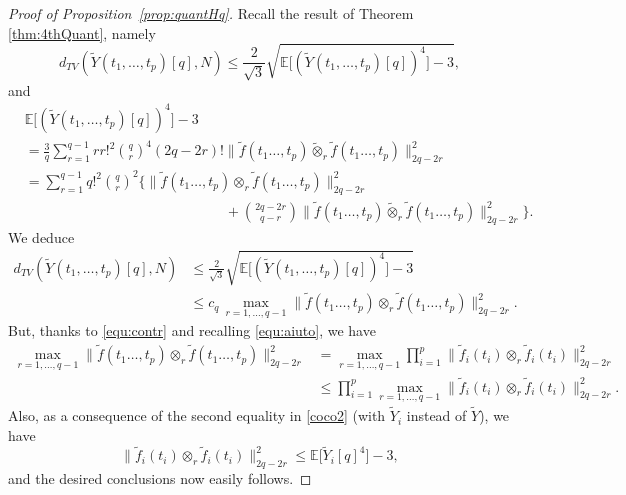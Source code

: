 \documentclass[12pt]{article}
\DeclareMathOperator{\1}{1}
\newcommand{\E}{\mathbb{E}}
\theoremstyle{plain}
\theoremstyle{definition}
\begin{document}
\begin{proof}[Proof of Proposition~\ref{prop:quantHq}]
    Recall the result of Theorem \ref{thm:4thQuant}, namely
    \begin{equation}\label{coco}
    d_{TV}(\widetilde Y{(t_1,\ldots,t_p)}[q],N)\le \frac{2}{\sqrt{3}} \sqrt{\E\big[(\widetilde Y{(t_1,\ldots,t_p)}[q])^4\big]-3},
    \end{equation}
    and
    \begin{align}
        & \E\big[(\widetilde Y{(t_1,\ldots,t_p)}[q])^4\big]-3 \label{coco2}\\
        & = \frac3q\sum_{r=1}^{q-1} rr!^2\binom{q}{r}^4(2q-2r)!
\|\widetilde f(t_1\ldots,t_p)\widetilde{\otimes}_r \widetilde f(t_1\ldots,t_p)\|^2_{2q-2r}\\
        &= \sum_{r=1}^{q-1} q!^2\binom{q}{r}^2\bigg\{\|\widetilde f(t_1\ldots,t_p)\otimes_r \widetilde f(t_1\ldots,t_p)\|^2_{2q-2r} \\
        & \hspace{6cm}
        +\binom{2q-2r}{q-r}\|\widetilde f(t_1\ldots,t_p)\widetilde{\otimes}_r \widetilde f(t_1\ldots,t_p)\|^2_{2q-2r}\bigg\}.
    \end{align}
    We deduce 
    \begin{align}
         d_{TV}(\widetilde Y{(t_1,\ldots,t_p)}[q],N)
        &\le \frac{2}{\sqrt{3}} \sqrt{\E\big[(\widetilde Y{(t_1,\ldots,t_p)}[q])^4\big]-3}\\
        &\le c_q\,\max_{r=1,\ldots,q-1} \|\widetilde f(t_1\ldots,t_p)\otimes_r  \widetilde  f(t_1\ldots,t_p)\|^2_{2q-2r}.
    \end{align}
    But, thanks to \eqref{equ:contr} and recalling \eqref{equ:aiuto}, 
   we have 
    \begin{align}
        \max_{r=1,\ldots,q-1} \|\widetilde f(t_1\ldots,t_p)\otimes_r  \widetilde  f(t_1\ldots,t_p)\|^2_{2q-2r}
        &= \max_{r=1,\ldots,q-1} \prod_{i=1}^p \|\widetilde f_i(t_i)\otimes_r \widetilde f_i(t_i)\|^2_{2q-2r}\\
        &\le  \prod_{i=1}^p \max_{r=1,\ldots,q-1} \|\widetilde f_i(t_i)\otimes_r \widetilde f_i(t_i)\|^2_{2q-2r}.
    \end{align}
    Also, as a consequence of the second equality in \eqref{coco2} (with $\widetilde{Y}_i$ instead of $\widetilde{Y}$), we have
    $$
    \|\widetilde f_i(t_i)\otimes_r \widetilde f_i(t_i)\|^2_{2q-2r} \leq \E\big[\widetilde Y_i[q]^4\big]-3,
    $$
    and the desired conclusions now easily follows.
\end{proof}
\end{document}
